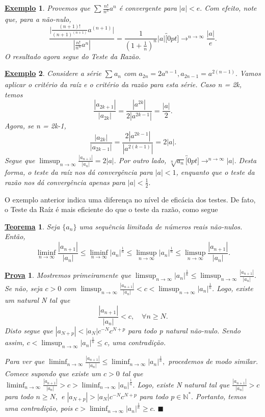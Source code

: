 \documentclass{article}
\newtheorem*{theorem*}{\underline{Teorema}}
\newtheorem{example}{\underline{Exemplo}}
\newtheorem*{proof*}{\underline{Prova}}
\renewcommand\qedsymbol{$\blacksquare$}
\begin{document}
\begin{example}
  Provemos que $\sum\limits_{}^{}\frac{n!}{n^{n}}a^{n}$ \'e convergente para $|a|<e.$ Com efeito, note que, para a n\~ao-nulo, 
    $$
      \frac{\biggl|\frac{(n+1)!}{(n+1)^{(n+1)}}a^{(n+1)}\biggr|}{|\frac{n!}{n^{n}}a^{n}|} = \frac{1}{(1+\frac{1}{n})^{n}}|a|\overbracket[0pt]{\longrightarrow}^{n\to \infty}\frac{|a|}{e}.
    $$ 
    O resultado agora segue do Teste da Raz\~ao.
\end{example}
\begin{example}
  Considere a s\'erie $\sum\limits_{}^{}a_{n}$ com $a_{2n}=2a^{n-1}, a_{2n-1} = a^{2(n-1)}.$ Vamos aplicar o crit\'erio da ra\'iz
e o crit\'erio da raz\~ao para esta s\'erie. Caso n = 2k, temos 
  $$
    \frac{|a_{2k+1}|}{|a_{2k}|} = \frac{|a^{2k}|}{2|a^{2k-1}|} = \frac{|a|}{2}.
  $$
  Agora, se n = 2k-1, 
    $$
      \frac{|a_{2k}|}{|a_{2k-1}|} = \frac{2|a^{2k-1}|}{|a^{2(k-1)}|} = 2|a|.
    $$
    Segue que $\limsup_{n\to\infty}\frac{|a_{n+1}|}{|a_{n}|} = 2|a|.$ Por outro lado, $\sqrt[n]{a_{n}}\overbracket[0pt]{\longrightarrow}^{n\to \infty}|a|.$
Desta forma, o teste da ra\'iz nos d\'a converg\^encia para $|a|<1$, enquanto que o teste da raz\~ao nos d\'a converg\^encia apenas
para $|a|<\frac{1}{2}.$
\end{example}
O exemplo anterior indica uma diferen\c ca no n\'ivel de efic\'acia dos testes. De fato, o Teste da Ra\'iz \'e mais eficiente do que 
o teste da raz\~ao, como segue 
\begin{theorem*}
  Seja $\{a_{n}\}$ uma sequ\^encia limitada de n\'umeros reais n\~ao-nulos. Ent\~ao, 
    $$
      \liminf_{n\to\infty}\frac{|a_{n+1}|}{|a_{n}|}\leq{\liminf_{n\to\infty}}|a_{n}|^{\frac{1}{n}}\leq{\limsup_{n\to\infty}|a_{n}|^{\frac{1}{n}}}\leq{\limsup_{n\to\infty}\frac{|a_{n+1}|}{|a_{n}|}}.
    $$
\end{theorem*}
\begin{proof*}
  Mostremos primeiramente que $\limsup_{n\to\infty}|a_{n}|^{\frac{1}{n}}\leq{\limsup_{n\to\infty}\frac{|a_{n+1}|}{|a_{n}|}}.$
Se n\~ao, seja $c>0$ com $\limsup_{n\to\infty}\frac{|a_{n+1}|}{|a_{n}|}<c<\limsup_{n\to\infty}|a_{n}|^{\frac{1}{n}}.$ Logo,
existe um natural N tal que 
  $$
    \frac{|a_{n+1}|}{|a_{n}|}<c,\quad \forall n\geq{N}.
  $$
  Disto segue que $|a_{N+p}|<|a_{N}|c^{-N}c^{N+p}$ para todo p natural n\~ao-nulo. Sendo assim, $c < \limsup_{n\to\infty}|a_{n}|^{\frac{1}{n}}\leq{c}$,
uma contradi\c c\~ao. 

  Para ver que $\liminf_{n\to\infty}\frac{|a_{n+1}|}{|a_{n}|}\leq{\liminf_{n\to\infty}|a_{n}|^{\frac{1}{n}}},$ procedemos de modo similar.
Comece supondo que existe um $c > 0$ tal que $\liminf_{n\to\infty}\frac{|a_{n+1}|}{|a_{n}|}> c > \liminf_{n\to\infty}|a_{n}|^{\frac{1}{n}}.$
Logo, existe N natural tal que $\frac{|a_{n+1}|}{|a_{n}|}>c$ para todo $n\geq{N},$ e $|a_{N+p}|>|a_{N}|c^{-N}c^{N+p}$ para todo
 $p\in \mathbb{N}^{*}.$ Portanto, temos uma contradi\c c\~ao, pois $c > \liminf_{n\to\infty}|a_{n}|^{\frac{1}{n}} \geq{c}.$ \qedsymbol
\end{proof*}
\end{document}
